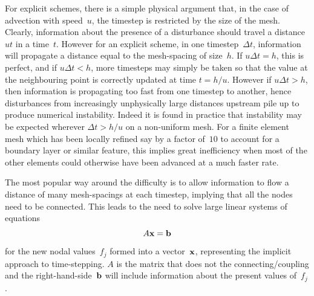 For explicit schemes, there is a simple physical argument that, in the case
of advection with speed~$u$, the timestep is restricted by the size of the mesh.
Clearly, information about the presence of a disturbance should travel a distance
$u t$ in a time~$t$. However for an explicit scheme, in one timestep~$\Delta t$,
information will propagate a distance equal to
the mesh-spacing of size~$h$. If $u \Delta t=h$, this is perfect,
and if $u \Delta t<h$, more timesteps may simply be taken so that the value
at the neighbouring point is correctly updated at time $t=h/u$.
However if $u \Delta t>h$, then information is propagating too fast from one
timestep to another, hence disturbances from increasingly unphysically large
distances upstream pile up to produce numerical instability.
Indeed it is found in practice that instability may be expected
wherever $\Delta t>h/u$ on a non-uniform mesh. For a finite element mesh which has been
locally refined say by a factor of~$10$ to account for a boundary layer
or similar feature, this implies great inefficiency when most of the other elements
could otherwise have been advanced at a much faster rate.

The most popular way around the difficulty is to
allow information to flow a distance of many mesh-spacings at each timestep, implying that 
all the nodes need to be connected. This leads to the need to
solve large linear systems of equations 
\begin{equation} \label{eq:mat}
A{\bf x} = {\bf b}
\end{equation}
for the new nodal values~$f_j$ formed into a vector~${\bf x}$,
representing the implicit approach to time-stepping. $A$ is the
matrix that does not the connecting/coupling and the right-hand-side~${\bf b}$
will include information about the present values of~$f_j$.


